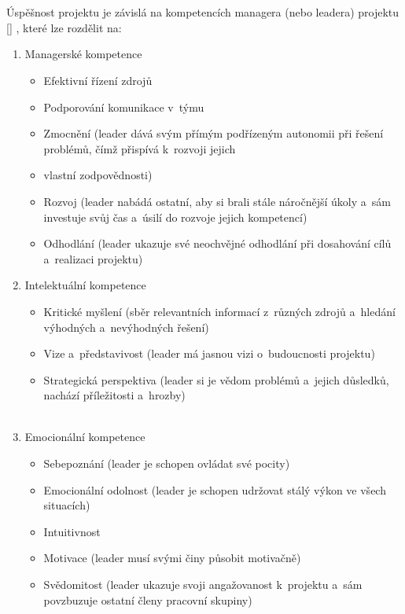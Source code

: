 \documentclass[
	11pt, oneside, printed, final, palatino, monochrome
	microtype,
	table,   %
	lof,     %
	lot     %
]{fithesis3}
\newcommand{\citepages}[2]{[\cite[#1]{#2}]}
\newcommand{\mezera}{\bigskip}
\begin{document}
{~\\~\\%
Úspěšnost projektu je závislá na kompetencích managera (nebo leadera) projektu \citepages{s. 437–448}{Muller2010437}
, které lze rozdělit na: 
\mezera
\begin{enumerate}
\item Managerské kompetence
\begin{itemize}
\item Efektivní řízení zdrojů
\item Podporování komunikace v~týmu
\item Zmocnění (leader dává svým přímým podřízeným autonomii při řešení problémů, čímž přispívá k~rozvoji jejich \item vlastní zodpovědnosti)
\item Rozvoj (leader nabádá ostatní, aby si brali stále náročnější úkoly a~sám investuje svůj čas a~úsilí do rozvoje jejich kompetencí)
\item Odhodlání (leader ukazuje své neochvějné odhodlání při dosahování cílů a~realizaci projektu)
\end{itemize}
\item Intelektuální kompetence
\begin{itemize}
\item Kritické myšlení (sběr relevantních informací z~různých zdrojů a~hledání výhodných a~nevýhodných řešení)
\item Vize a~představivost (leader má jasnou vizi o~budoucnosti projektu)
\item Strategická perspektiva (leader si je vědom problémů a~jejich důsledků, nachází příležitosti a~hrozby) \\~\\%
\end{itemize}
\item Emocionální kompetence
\begin{itemize}
\item Sebepoznání (leader je schopen ovládat své pocity)
\item Emocionální odolnost (leader je schopen udržovat stálý výkon ve všech situacích)
\item Intuitivnost
\item Motivace (leader musí svými činy působit motivačně)
\item Svědomitost (leader ukazuje svoji angažovanost k~projektu a~sám povzbuzuje ostatní členy pracovní skupiny)
\end{itemize}
\end{enumerate}

}
\end{document}

